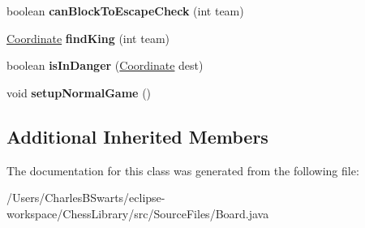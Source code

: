 \begin{DoxyCompactItemize}
boolean {\bfseries can\+Block\+To\+Escape\+Check} (int team)
\item 
\mbox{\label{class_source_files_1_1_board_a015cf25758362c357cbe22c16d16ce8a}} 
\mbox{\hyperlink{class_source_files_1_1_coordinate}{Coordinate}} {\bfseries find\+King} (int team)
\item 
\mbox{\label{class_source_files_1_1_board_af2ecfd97a28c5bb54cd8e59c8e7669b3}} 
boolean {\bfseries is\+In\+Danger} (\mbox{\hyperlink{class_source_files_1_1_coordinate}{Coordinate}} dest)
\item 
\mbox{\label{class_source_files_1_1_board_ad914cd023063965629caece5bb73e142}} 
void {\bfseries setup\+Normal\+Game} ()
\end{DoxyCompactItemize}
\subsection*{Additional Inherited Members}


The documentation for this class was generated from the following file\+:\begin{DoxyCompactItemize}
\item 
/\+Users/\+Charles\+B\+Swarts/eclipse-\/workspace/\+Chess\+Library/src/\+Source\+Files/Board.\+java\end{DoxyCompactItemize}
